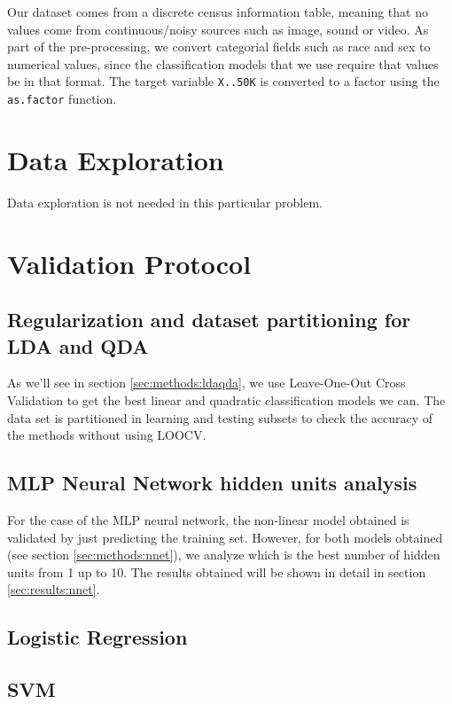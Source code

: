 \documentclass[english]{scrartcl}
\newcommand\ms[1]{\texttt{#1}}
\newcommand\R[1]{\texttt{#1}}
\begin{document}
Our dataset comes from a discrete census information table, meaning that no values come from continuous/noisy sources such as image, sound or video. As part of the pre-processing, we convert categorial fields such as race and sex to numerical values, since the classification models that we use require that values be in that format. The target variable \ms{X..50K} is converted to a factor using the \R{as.factor} function.

\section{Data Exploration}

Data exploration is not needed in this particular problem.

\section{Validation Protocol}

    \subsection{Regularization and dataset partitioning for LDA and QDA}
    As we'll see in section \ref{sec:methods:ldaqda}, we use Leave-One-Out Cross Validation to get the best linear and quadratic classification models we 
    can. The data set is partitioned in learning and testing subsets to check the accuracy of the methods without using LOOCV.
    
    \subsection{MLP Neural Network hidden units analysis}
    For the case of the MLP neural network, the non-linear model obtained is validated by just predicting the training set. However, for both models obtained
    (see section \ref{sec:methods:nnet}), we analyze which is the best number of hidden units from 1 up to 10. The results obtained will be shown in detail in
    section \ref{sec:results:nnet}.
    
    \subsection{Logistic Regression}    
    
    \subsection{SVM}
\end{document}
